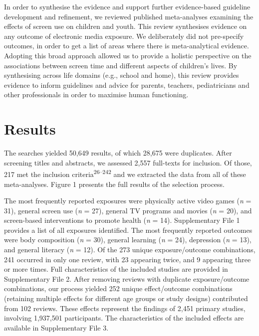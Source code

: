 \documentclass[
  english,
  man]{apa6}
\begin{document}
In order to synthesise the evidence and support further evidence-based guideline development and refinement, we reviewed published meta-analyses examining the effects of screen use on children and youth.
This review synthesises evidence on any outcome of electronic media exposure.
We deliberately did not pre-specify outcomes, in order to get a list of areas where there is meta-analytical evidence.
Adopting this broad approach allowed us to provide a holistic perspective on the associations between screen time and different aspects of children's lives.
By synthesising across life domains (e.g., school and home), this review provides evidence to inform guidelines and advice for parents, teachers, pediatricians and other professionals in order to maximise human functioning.

\newpage

\hypertarget{results}{%
\section{Results}\label{results}}

The searches yielded 50,649 results, of which 28,675 were duplicates.
After screening titles and abstracts, we assessed 2,557 full-texts for inclusion.
Of those, 217 met the inclusion criteria\textsuperscript{26--242} and we extracted the data from all of these meta-analyses.
Figure 1 presents the full results of the selection process.

The most frequently reported exposures were physically active video games (\emph{n} = 31), general screen use (\emph{n} = 27), general TV programs and movies (\emph{n} = 20), and screen-based interventions to promote health (\emph{n} = 14).
Supplementary File 1 provides a list of all exposures identified.
The most frequently reported outcomes were body composition (\emph{n} = 30), general learning (\emph{n} = 24), depression (\emph{n} = 13), and general literacy (\emph{n} = 12).
Of the 273 unique exposure/outcome combinations, 241 occurred in only one review, with 23 appearing twice, and 9 appearing three or more times.
Full characteristics of the included studies are provided in Supplementary File 2.
After removing reviews with duplicate exposure/outcome combinations, our process yielded 252 unique effect/outcome combinations (retaining multiple effects for different age groups or study designs) contributed from 102 reviews.
These effects represent the findings of 2,451 primary studies, involving 1,937,501 participants.
The characteristics of the included effects are available in Supplementary File 3.
\end{document}
